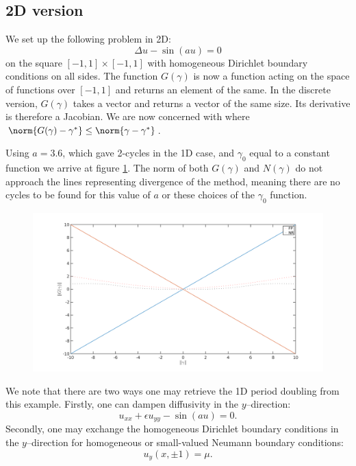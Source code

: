 \documentclass{article}
\begin{document}
\subsection{2D version}

We set up the following problem in 2D:
\begin{equation*}
\Delta u - \sin(au) = 0
\end{equation*}
on the square $[-1,1] \times [-1,1]$ with homogeneous Dirichlet boundary conditions on all sides.
The function $G(\gamma)$ is now a function acting on the space of functions over $[-1,1]$ and returns an element of the same.
In the discrete version, $G(\gamma)$ takes a vector and returns a vector of the same size.
Its derivative is therefore a Jacobian.
We are now concerned with where $\norm{G(\gamma) - \gamma^*} \leq \norm{\gamma - \gamma^*}$.

Using $a=3.6$, which gave 2-cycles in the 1D case, and $\gamma_0$ equal to a constant function we arrive at figure \ref{fig:exp16_03}.
The norm of both $G(\gamma)$ and $N(\gamma)$ do not approach the lines representing divergence of the method, meaning there are no cycles to be found for this value of $a$ or these choices of the $\gamma_0$ function.

\begin{figure}
	\includegraphics[width=\textwidth]{exp16_03.png}
	\caption{}
	\label{fig:exp16_03}
\end{figure}

We note that there are two ways one may retrieve the 1D period doubling from this example.
Firstly, one can dampen diffusivity in the $y$--direction:
\begin{equation*}
	u_{xx} + \epsilon u_{yy} - \sin(au) = 0.
\end{equation*}
Secondly, one may exchange the homogeneous Dirichlet boundary conditions in the $y$--direction for homogeneous or small-valued Neumann boundary conditions:
\begin{equation*}
u_y(x,\pm1) = \mu.
\end{equation*}
\end{document}
